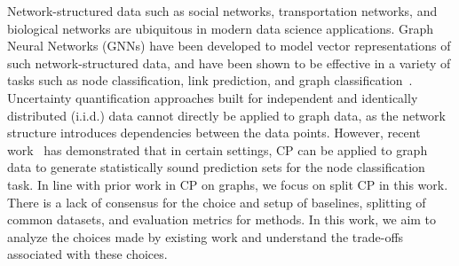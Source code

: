 Network-structured data such as social networks, transportation networks, and biological networks are ubiquitous in modern data science applications.
Graph Neural Networks (GNNs) have been developed to model vector representations of such network-structured data, and have been shown to be effective in a variety of tasks such as node classification, link prediction, and graph classification~\citep{hamilton2020graph, wu2022graph}.
Uncertainty quantification approaches built for independent and identically distributed (i.i.d.) data cannot directly be applied to graph data, as the network structure introduces dependencies between the data points.
However, recent work~\citep{clarkson2023distribution,zargarbashi23conformal,huang2024uncertainty} has demonstrated that in certain settings, CP can be applied to graph data to generate statistically sound prediction sets for the node classification task.
In line with prior work in CP on graphs, we focus on split CP in this work.
There is a lack of consensus for the choice and setup of baselines, splitting of common datasets, and evaluation metrics for methods.
In this work, we aim to analyze the choices made by existing work and understand the trade-offs associated with these choices.
